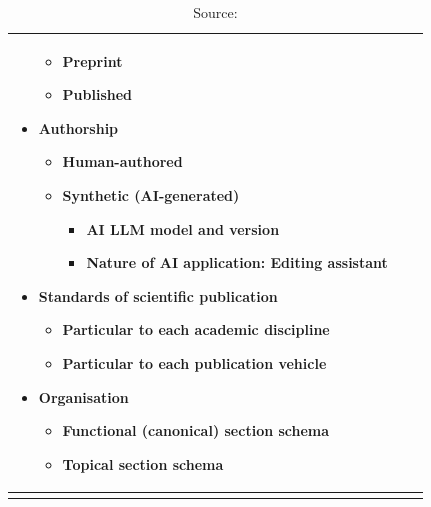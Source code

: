 \begin{longtable}[c]{ |p{8cm}|p{8cm}|p{8cm}| }
\begin{itemize}
        \begin{itemize}
            \item Preprint
            \item Published
        \end{itemize}
        \item Authorship
        \begin{itemize}
            \item Human-authored
            \item Synthetic (AI-generated)
            \begin{itemize}
                \item AI LLM model and version
                \item Nature of AI application: Editing assistant
            \end{itemize}
        \end{itemize}
        \item Standards of scientific publication
        \begin{itemize}
            \item Particular to each academic discipline
            \item Particular to each publication vehicle
        \end{itemize}
        \item Organisation
        \begin{itemize}
            \item Functional (canonical) section schema
            \item Topical section schema
        \end{itemize}
    \end{itemize}
     &
    
     &
    
     \\ \hline
    \caption*{Source: \textcite{egbertDomainConsiderations2022}}
\end{longtable}

